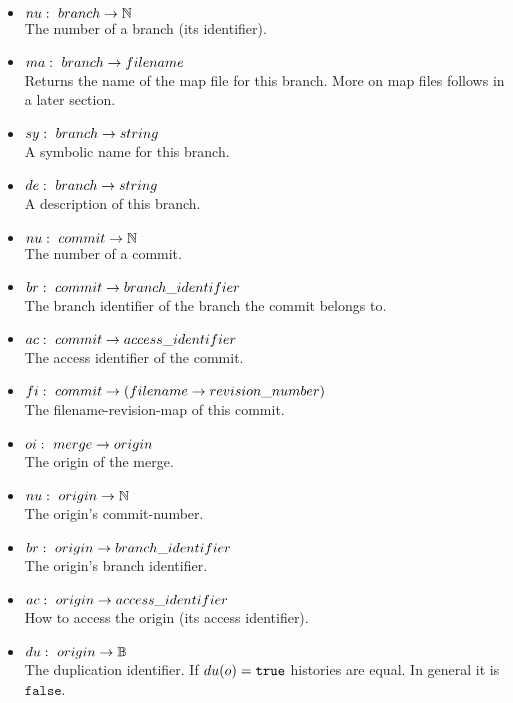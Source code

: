 \documentclass[fleqn, 10pt, a4paper]{article}
\begin{document}
\begin{itemize}
\item $\mathnormal{nu}:\ \mathnormal{branch} \rightarrow \mathbb{N}$ \\
The number of a branch (its identifier).
\item $\mathnormal{ma}:\ \mathnormal{branch} \rightarrow \mathnormal{filename}$ \\
Returns the name of the map file for this branch. More on map files follows in
a later section.
\item $\mathnormal{sy}:\ \mathnormal{branch} \rightarrow \mathnormal{string}$ \\
A symbolic name for this branch.
\item $\mathnormal{de}:\ \mathnormal{branch} \rightarrow \mathnormal{string}$ \\
A description of this branch.
\item $\mathnormal{nu}:\ \mathnormal{commit} \rightarrow \mathbb{N}$ \\
The number of a commit.
\item $\mathnormal{br}:\ \mathnormal{commit} \rightarrow \mathnormal{branch\_identifier}$ \\
The branch identifier of the branch the commit belongs to.
\item $\mathnormal{ac}:\ \mathnormal{commit} \rightarrow \mathnormal{access\_identifier}$ \\
The access identifier of the commit.
\item $\mathnormal{fi}:\ \mathnormal{commit} \rightarrow (\mathnormal{filename}
\rightarrow \mathnormal{revision\_number})$ \\
The filename-revision-map of this commit.
\item $\mathnormal{oi}:\ \mathnormal{merge} \rightarrow \mathnormal{origin}$ \\
The origin of the merge.
\item $\mathnormal{nu}:\ \mathnormal{origin} \rightarrow \mathbb{N}$ \\
The origin's commit-number.
\item $\mathnormal{br}:\ \mathnormal{origin} \rightarrow \mathnormal{branch\_identifier}$ \\
The origin's branch identifier.
\item $\mathnormal{ac}:\ \mathnormal{origin} \rightarrow \mathnormal{access\_identifier}$ \\
How to access the origin (its access identifier).
\item $\mathnormal{du}:\ \mathnormal{origin} \rightarrow \mathbb{B}$ \\
The duplication identifier. If $\mathnormal{du}(o) = \mathtt{true}$
histories are equal. In general it is $\mathtt{false}$.
\end{itemize}
\end{document}
